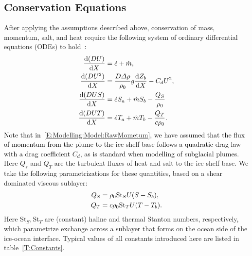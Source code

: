 \documentclass[openacc]{rsproca_new}%
\newcommand{\dd}[2]{\frac{\mathrm{d} #1}{\mathrm{d} #2}}
\newcommand{\red}[1]{{\color{red} #1}}
\newcommand{\blue}[1]{{\color{blue} #1}}
\newcommand{\rout}[1]{\red{\st{#1}}}\newcommand{\ab}[1]{\textcolor{Green}{#1}}\newcommand{\about}[1]{\textcolor{Cyan}{\sout{#1}}}
\renewcommand{\rout}[1]{{}} %
\renewcommand{\blue}[1]{{\textcolor{black}{#1}}} %
\renewcommand{\red}[1]{{}} %
\begin{document}
\subsection{Conservation Equations} 
After applying the assumptions described above,\rout{ and making a standard Boussinesq approximation,} conservation of mass, momentum, salt, and heat require the following system of ordinary differential equations (ODEs) to hold~\cite{Jenkins2011JPhysOcean,Magorrian2016JGeoResOcean}:
\begin{align}
\dd{(DU)}{X} &= \dot{e} + \dot{m},\label{E:Modelling:Model:RawMass}\\
\dd{(DU^2)}{X} &= \frac{D\Delta \rho}{\rho_0} g \dd{Z_b}{X}  -\red{\frac{\tau_T}{\rho_0}} \blue{C_d U^2},\label{E:Modelling:Model:RawMometum}\\
\dd{(DUS)}{X} &= \dot{e}S_a + \dot{m}S_b -\frac{Q_S}{\rho_0}\label{E:Modelling:Model:RawSalt}\\
\dd{(DUT)}{X} &= \dot{e}T_a + \dot{m}T_b -\frac{Q_T}{c \rho_0}.\label{E:Modelling:Model:RawTemp}
\end{align}
\blue{Note that in~\eqref{E:Modelling:Model:RawMometum}, we have assumed that the flux of momentum from the plume to the ice shelf base follows a quadratic drag law with a drag coefficient $C_d$, as is standard when modelling of subglacial plumes.} Here\rout{ $\tau_T$,} $Q_s$ and $Q_T$ are the turbulent fluxes of\rout{ momentum,} heat\rout{,} and salt to the ice shelf base. We take the following parametrizations for these quantities, based on a\rout{ quadratic drag law and} shear dominated viscous sublayer:
\begin{align}
Q_S &= \rho_0 \mathrm{St}_S U (S - S_b),\label{E:Modelling:Model:TurbulentSalt} \\
Q_T &= c \rho_0 \mathrm{St}_T U (T -T_b)\red{,}\blue{.}\label{E:Modelling:Model:TurbulentHeat}
\end{align}
Here $\mathrm{St}_S, \mathrm{St}_T$ are (constant) haline and thermal Stanton numbers, respectively, which parametrize exchange across a sublayer that forms on the ocean side of the ice-ocean interface\rout{, $C_d$ is a drag coefficient, and $c_i$ is the specific heat capacity of ice}. Typical values of all constants introduced here are listed in table~\ref{T:Constants}.
\end{document}
